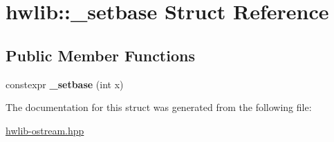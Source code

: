 \hypertarget{structhwlib_1_1__setbase}{}\section{hwlib\+:\+:\+\_\+setbase Struct Reference}
\label{structhwlib_1_1__setbase}
\subsection*{Public Member Functions}
\begin{DoxyCompactItemize}
\item 
constexpr {\bfseries \+\_\+setbase} (int x)\hypertarget{structhwlib_1_1__setbase_aacb4b037a7f55889db8afba3c31128a1}{}\label{structhwlib_1_1__setbase_aacb4b037a7f55889db8afba3c31128a1}

\end{DoxyCompactItemize}


The documentation for this struct was generated from the following file\+:\begin{DoxyCompactItemize}
\item 
\hyperlink{hwlib-ostream_8hpp}{hwlib-\/ostream.\+hpp}\end{DoxyCompactItemize}
